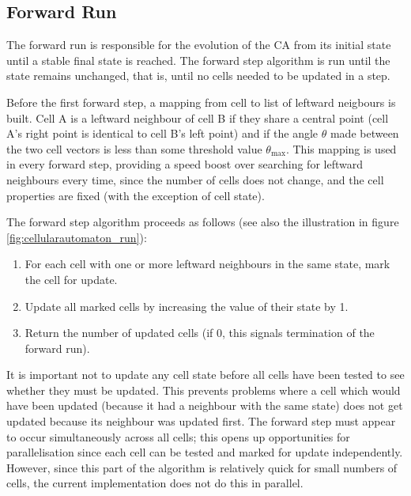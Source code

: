\subsection{Forward Run}\label{sec:cellularautomaton_forward_run}
The forward run is responsible for the evolution of the \ac{CA} from its initial state until a stable final state is reached. The forward step algorithm is run until the state remains unchanged, that is, until no cells needed to be updated in a step.

Before the first forward step, a mapping from cell to list of leftward neigbours is built. Cell A is a leftward neighbour of cell B if they share a central point (cell A's right point is identical to cell B's left point) and if the angle $\theta$ made between the two cell vectors is less than some threshold value $\theta_\mathrm{max}$. This mapping is used in every forward step, providing a speed boost over searching for leftward neighbours every time, since the number of cells does not change, and the cell properties are fixed (with the exception of cell state).

The forward step algorithm proceeds as follows (see also the illustration in figure \ref{fig:cellularautomaton_run}):
\begin{enumerate}
	\item For each cell with one or more leftward neighbours in the same state, mark the cell for update.
	\item Update all marked cells by increasing the value of their state by 1.
	\item Return the number of updated cells (if 0, this signals termination of the forward run).
\end{enumerate}

It is important not to update any cell state before all cells have been tested to see whether they must be updated. This prevents problems where a cell which would have been updated (because it had a neighbour with the same state) does not get updated because its neighbour was updated first. The forward step must appear to occur simultaneously across all cells; this opens up opportunities for parallelisation since each cell can be tested and marked for update independently. However, since this part of the algorithm is relatively quick for small numbers of cells, the current implementation does not do this in parallel.

